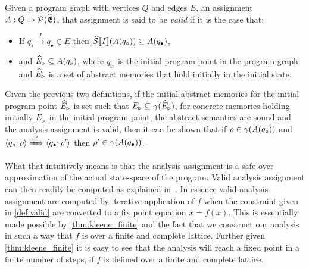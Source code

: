 \begin{definition}
    \label{def:valid}
    Given a program graph with vertices $Q$ and edges $E$, an assignment $A : Q \rightarrow \mathcal{P}(\widehat{\mathfrak{E}})$, that assignment is said to be \emph{valid} if it is the case that:
    \begin{itemize}
        \item If $q_\circ \xrightarrow{I} q_\bullet \in E$ then $\widehat{\mathcal{S}} \llbracket I \rrbracket(A(q_\circ)) \subseteq A(q_\bullet)$,
        \item and $\widehat{E}_\triangleright \subseteq A(q_\triangleright)$, where $q_\triangleright$ is the initial program point in the program graph and $\widehat{E}_\triangleright$ is a set of abstract memories that hold initially in the initial state.
    \end{itemize}
\end{definition}

Given the previous two definitions, if the initial abstract memories for the initial program point $\widehat{E}_\triangleright$ is set such that $E_{\triangleright} \subseteq \gamma(\widehat{E}_\triangleright)$, for concrete memories holding initially $E_{\triangleright}$ in the initial program point, the abstract semantics are sound and the analysis assignment is valid, then it can be shown that if $\rho \in \gamma(A(q_\circ))$ and $\langle q_\circ; \rho \rangle \xRightarrow{\omega^\star} \langle q_\bullet; \rho' \rangle$ then $\rho' \in \gamma(A(q_\bullet))$.

What that intuitively means is that the analysis assignment is a safe over approximation of the actual state-space of the program.
Valid analysis assignment can then readily be computed as explained in~\cite{nielson_formal_2019}.
In essence valid analysis assignment are computed by iterative application of $f$ when the constraint given in \autoref{def:valid} are converted to a fix point equation $x = f(x)$.
This is essentially made possible by \autoref{thm:kleene_finite} and the fact that we construct our analysis in such a way that $f$ is over a finite and complete lattice.
Further given \autoref{thm:kleene_finite} it is easy to see that the analysis will reach a fixed point in a finite number of steps, if $f$ is defined over a finite and complete lattice.

